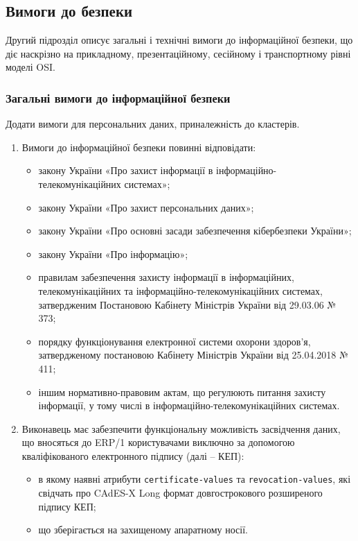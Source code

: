 \documentclass{article}
\begin{document}
\newpage

\subsection{Вимоги до безпеки}

Другий підрозділ описує загальні і технічні вимоги до інформаційної безпеки, що діє наскрізно на прикладному,
презентаційному, сесійному і транспортному рівні моделі OSI.

\subsubsection{Загальні вимоги до інформаційної безпеки}

Додати вимоги для персональних даних, приналежність до кластерів.

\begin{enumerate}
  \item Вимоги до інформаційної безпеки повинні відповідати:
    \begin{itemize}
      \item закону України «Про захист інформації в інформаційно-телекомунікаційних системах»;
      \item закону України «Про захист персональних даних»;
      \item закону України «Про основні засади забезпечення кібербезпеки України»;
      \item закону України «Про інформацію»;
      \item правилам забезпечення захисту інформації в інформаційних, телекомунікаційних та інформаційно-телекомунікаційних системах, затвердженим Постановою Кабінету Міністрів України від 29.03.06 № 373;
      \item порядку функціонування електронної системи охорони здоров’я, затвердженому постановою Кабінету Міністрів України від 25.04.2018 № 411;
      \item іншим нормативно-правовим актам, що регулюють питання захисту інформації, у тому числі в інформаційно-телекомунікаційних системах.
    \end{itemize}

  \item Виконавець має забезпечити функціональну можливість засвідчення даних, що вносяться до ERP/1
        користувачами виключно за допомогою кваліфікованого електронного підпису (далі – КЕП):
    \begin{itemize}
      \item в якому наявні атрибути \texttt{certificate-values} та \texttt{revocation-values},
            які свідчать про CAdES-X Long формат довгострокового розширеного підпису КЕП;
      \item що зберігається на захищеному апаратному носії.
    \end{itemize}


\end{enumerate}
\end{document}
